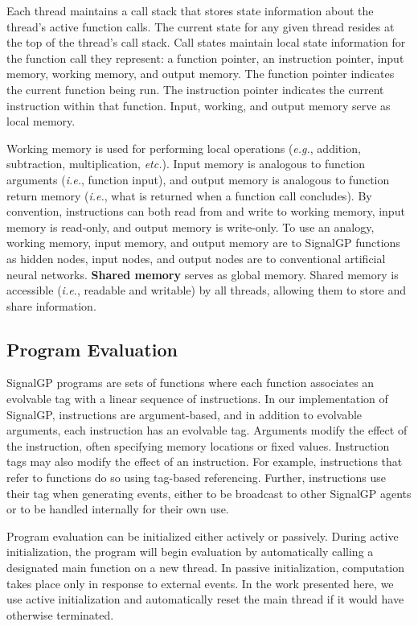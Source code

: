 Each thread maintains a call stack that stores state information about the thread's active function calls. 
The current state for any given thread resides at the top of the thread's call stack. 
Call states maintain local state information for the function call they represent: a function pointer, an instruction pointer, input memory, working memory, and output memory. 
The function pointer indicates the current function being run. 
The instruction pointer indicates the current instruction within that function. 
Input, working, and output memory serve as local memory. 

Working memory is used for performing local operations (\textit{e.g.}, addition, subtraction, multiplication, \textit{etc.}). 
Input memory is analogous to function arguments (\textit{i.e.}, function input), and output memory is analogous to function return memory (\textit{i.e.}, what is returned when a function call concludes). 
By convention, instructions can both read from and write to working memory, input memory is read-only, and output memory is write-only. 
To use an analogy, working memory, input memory, and output memory are to SignalGP functions as hidden nodes, input nodes, and output nodes are to conventional artificial neural networks.  
\textbf{Shared memory} serves as global memory. 
Shared memory is accessible (\textit{i.e.}, readable and writable) by all threads, allowing them to store and share information. 

\subsection{Program Evaluation}

SignalGP programs are sets of functions where each function associates an evolvable tag with a linear sequence of instructions. 
In our implementation of SignalGP, instructions are argument-based, and in addition to evolvable arguments, each instruction has an evolvable tag. 
Arguments modify the effect of the instruction, often specifying memory locations or fixed values. 
Instruction tags may also modify the effect of an instruction. For example, instructions that refer to functions do so using tag-based referencing. 
Further, instructions use their tag when generating events, either to be broadcast to other SignalGP agents or to be handled internally for their own use. 

Program evaluation can be initialized either actively or passively.  
During active initialization, the program will begin evaluation by automatically calling a designated main function on a new thread.  
In passive initialization, computation takes place only in response to external events.  
In the work presented here, we use active initialization and automatically reset the main thread if it would have otherwise terminated.

